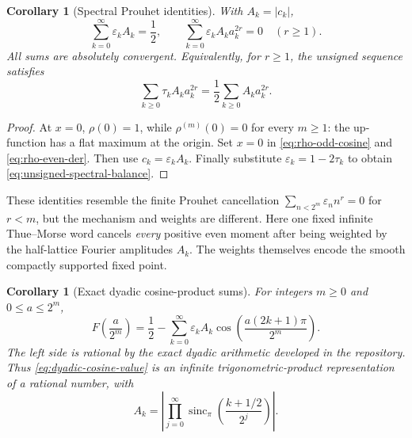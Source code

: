 \documentclass[11pt]{article}
\newtheorem{corollary}[theorem]{Corollary}
\theoremstyle{definition}
\theoremstyle{remark}
\newcommand{\eps}{\varepsilon}
\newcommand{\sincpi}{\operatorname{sinc}_{\pi}}
\begin{document}
\begin{corollary}[Spectral Prouhet identities]
\label{cor:spectral-prouhet}
With \(A_k=|c_k|\),
\begin{equation}
\boxed{
 \sum_{k=0}^{\infty}\eps_kA_k=\frac12,
 \qquad
 \sum_{k=0}^{\infty}\eps_kA_ka_k^{2r}=0\quad(r\ge1).}     \label{eq:spectral-prouhet}
\end{equation}
All sums are absolutely convergent.  Equivalently, for \(r\ge1\), the unsigned sequence
satisfies
\begin{equation}
 \sum_{k\ge0}\tau_kA_ka_k^{2r}
 =\frac12\sum_{k\ge0}A_ka_k^{2r}.                         \label{eq:unsigned-spectral-balance}
\end{equation}
\end{corollary}

\begin{proof}
At \(x=0\), \(\rho(0)=1\), while \(\rho^{(m)}(0)=0\) for every \(m\ge1\): the up-function
has a flat maximum at the origin.  Set \(x=0\) in \eqref{eq:rho-odd-cosine} and
\eqref{eq:rho-even-der}.  Then use \(c_k=\eps_kA_k\).  Finally substitute
\(\eps_k=1-2\tau_k\) to obtain \eqref{eq:unsigned-spectral-balance}.
\end{proof}

These identities resemble the finite Prouhet cancellation
\(\sum_{n<2^m}\eps_nn^r=0\) for \(r<m\), but the mechanism and weights are different.
Here one fixed infinite Thue--Morse word cancels \emph{every} positive even moment after
being weighted by the half-lattice Fourier amplitudes \(A_k\).  The weights themselves
encode the smooth compactly supported fixed point.

\begin{corollary}[Exact dyadic cosine-product sums]
\label{cor:dyadic-cosine-products}
For integers \(m\ge0\) and \(0\le a\le2^m\),
\begin{equation}
 F\!\left(\frac{a}{2^m}\right)
 =\frac12-\sum_{k=0}^{\infty}\eps_kA_k
   \cos\!\left(\frac{a(2k+1)\pi}{2^m}\right).             \label{eq:dyadic-cosine-value}
\end{equation}
The left side is rational by the exact dyadic arithmetic developed in the repository.
Thus \eqref{eq:dyadic-cosine-value} is an infinite trigonometric-product representation of
a rational number, with
\begin{equation}
 A_k=\left|
 \prod_{j=0}^{\infty}
 \sincpi\!\left(\frac{k+1/2}{2^j}\right)
 \right|.                                                   \label{eq:Ak-product}
\end{equation}
\end{corollary}
\end{document}
